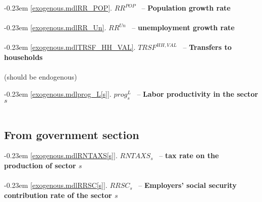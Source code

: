 \documentclass[12pt]{article}
\numberwithin{equation}{section}
\begin{document}
\noindent \kern-0.23em \noindent \begingroup {} \label{exogenous.mdlRR_POP}\ref{exogenous.mdlRR_POP}.
         
        \ensuremath{RR^{POP}}~ \endgroup -- \noindent \textbf{Population growth rate}  \\ \\[-8pt]


\noindent \kern-0.23em \noindent \begingroup {} \label{exogenous.mdlRR_Un}\ref{exogenous.mdlRR_Un}.
         
        \ensuremath{RR^{Un}}~ \endgroup -- \noindent \textbf{unemployment growth rate}  \\ \\[-8pt]



\noindent \kern-0.23em \noindent \begingroup {} \label{exogenous.mdlTRSF_HH_VAL}\ref{exogenous.mdlTRSF_HH_VAL}.
         
        \ensuremath{TRSF^{HH,VAL}}~ \endgroup -- \noindent \textbf{Transfers to households}  \\ \\[-8pt](should be endogenous)


\noindent \kern-0.23em \noindent \begingroup {} \label{exogenous.mdlprog_L[s]}\ref{exogenous.mdlprog_L[s]}.
         
        \ensuremath{prog^{L}_{s}}~ \endgroup -- \noindent \textbf{Labor productivity in the sector $s$}  \\ \\[-8pt]











\subsection{From government section}




\noindent \kern-0.23em \noindent \begingroup {} \label{exogenous.mdlRNTAXS[s]}\ref{exogenous.mdlRNTAXS[s]}.
         
        \ensuremath{RNTAXS_{s}}~ \endgroup -- \noindent \textbf{tax rate on the production of sector $s$}  \\ \\[-8pt]


\noindent \kern-0.23em \noindent \begingroup {} \label{exogenous.mdlRRSC[s]}\ref{exogenous.mdlRRSC[s]}.
         
        \ensuremath{RRSC_{s}}~ \endgroup -- \noindent \textbf{Employers' social security contribution rate of the sector $s$}  \\ \\[-8pt]
\end{document}
